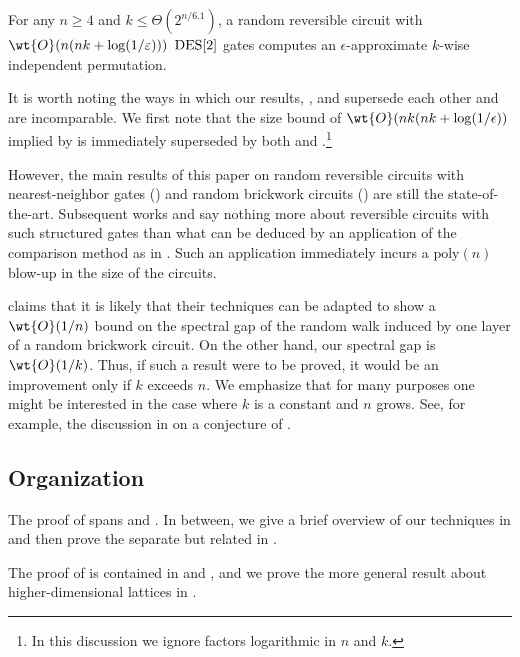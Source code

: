 \begin{theorem}\label{thm:chen}
    For any $n\geq4$ and $k\leq \Theta(2^{n/6.1})$, a random reversible circuit with $\wt{O}(n(nk+\log(1/\varepsilon)))$ $\mathrm{DES}[2]$ gates computes an $\epsilon$-approximate $k$-wise independent permutation.
\end{theorem}

It is worth noting the ways in which our results, , and  supersede each other and are incomparable. We first note that the size bound of $\wt{O}(nk(nk+\log(1/\epsilon))$ implied by  is immediately superseded by both  and .\footnote{In this discussion we ignore factors logarithmic in $n$ and $k$.}

However, the main results of this paper on random reversible circuits with nearest-neighbor gates () and random brickwork circuits () are still the state-of-the-art. Subsequent works \cite{gretta2024more} and \cite{chen2024incompressibility} say nothing more about reversible circuits with such structured gates than what can be deduced by an application of the comparison method as in . Such an application immediately incurs a $\mathrm{poly}(n)$ blow-up in the size of the circuits. 

\cite{chen2024incompressibility} claims that it is likely that their techniques can be adapted to show a $\wt{O}(1/n)$ bound on the spectral gap of the random walk induced by one layer of a random brickwork circuit. On the other hand, our spectral gap is $\wt{O}(1/k)$. Thus, if such a result were to be proved, it would be an improvement only if $k$ exceeds $n$. We emphasize that for many purposes one might be interested in the case where $k$ is a constant and $n$ grows. See, for example, the discussion in  on a conjecture of \cite{hoory2005simple}.



\subsection{Organization}
The proof of  spans  and . In between, we give a brief overview of our techniques in  and then prove the separate but related  in .

The proof of  is contained in  and , and we prove the more general result about higher-dimensional lattices in .

